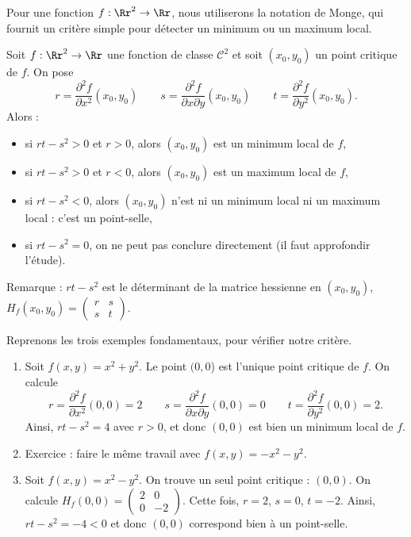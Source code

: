 \documentclass[11pt, class=report,crop=false]{standalone}
\begin{document}
Pour une fonction $f : \Rr^2 \to \Rr$, nous utiliserons la notation de Monge, qui fournit un critère simple pour détecter un minimum ou un maximum local.
\begin{theoreme}
Soit $f : \Rr^2 \to \Rr$ une fonction de classe $\mathcal{C}^2$ et soit $(x_0,y_0)$ un point critique de $f$.
 On pose 
$$
	r=\frac{\partial^2 f}{\partial x^2}(x_0,y_0)  
	\qquad 
	s=\frac{\partial^2 f}{\partial x \partial y}(x_0,y_0)
	\qquad
	t=\frac{\partial^2 f}{\partial y^2}(x_0,y_0).
$$
Alors :
\begin{itemize}
	\item si $rt-s^2>0$ et $r>0$, alors $(x_0,y_0)$ est un minimum local de $f$,
	\item si $rt-s^2>0$ et $r<0$, alors $(x_0,y_0)$ est un maximum local de $f$,
	\item si $rt-s^2<0$, alors $(x_0,y_0)$ n'est ni un minimum local ni un maximum local : c'est un point-selle,
	 \item si $rt-s^2=0$, on ne peut pas conclure directement (il faut approfondir l'étude).
\end{itemize}
\end{theoreme}

Remarque : $rt-s^2$ est le déterminant de la matrice hessienne en $(x_0,y_0)$, $H_f(x_0,y_0) = \begin{pmatrix}r&s\\s&t\end{pmatrix}$.

\begin{exemple}
Reprenons les trois exemples fondamentaux, pour vérifier notre critère.
\begin{enumerate}
	\item Soit  $f(x,y)=x^2+y^2$. Le point $(0,0$) est l'unique point critique de $f$.
On calcule 
$$r=\frac{\partial^2 f}{\partial x^2}(0,0)=2 
\qquad 
s=\frac{\partial^2 f}{\partial x \partial y}(0,0)=0
\qquad
t=\frac{\partial^2 f}{\partial y^2}(0,0)=2.$$
Ainsi, $rt-s^2 = 4$ avec $r>0$, et donc $(0,0)$ est bien un minimum local de $f$.
  \item Exercice : faire le même travail avec $f(x,y)=-x^2-y^2$. 
  \item Soit $f(x,y)=x^2-y^2$. On trouve un seul point critique : $(0,0)$. 
   On calcule $H_f(0,0) = \left(\begin{smallmatrix}2&0\\0&-2\end{smallmatrix}\right)$.
   Cette fois, $r=2$, $s=0$, $t=-2$. Ainsi, $rt-s^2 = -4 < 0$ et donc $(0,0)$ correspond bien à un point-selle.
\end{enumerate}

\end{exemple}
\end{document}
